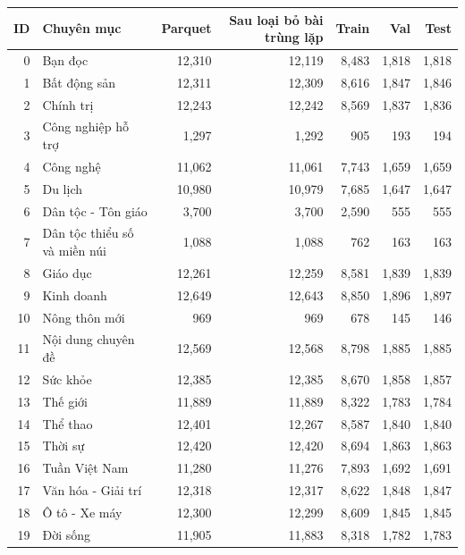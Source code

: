 \begin{tabularx}{\linewidth}{r>{\raggedright\arraybackslash}Xrrrrr}
\toprule
ID & Chuyên mục & Parquet & Sau loại bỏ bài trùng lặp & Train & Val & Test\\\midrule
0 & Bạn đọc & 12,310 & 12,119 & 8,483 & 1,818 & 1,818\\
1 & Bất động sản & 12,311 & 12,309 & 8,616 & 1,847 & 1,846\\
2 & Chính trị & 12,243 & 12,242 & 8,569 & 1,837 & 1,836\\
3 & Công nghiệp hỗ trợ & 1,297 & 1,292 & 905 & 193 & 194\\
4 & Công nghệ & 11,062 & 11,061 & 7,743 & 1,659 & 1,659\\
5 & Du lịch & 10,980 & 10,979 & 7,685 & 1,647 & 1,647\\
6 & Dân tộc - Tôn giáo & 3,700 & 3,700 & 2,590 & 555 & 555\\
7 & Dân tộc thiểu số và miền núi & 1,088 & 1,088 & 762 & 163 & 163\\
8 & Giáo dục & 12,261 & 12,259 & 8,581 & 1,839 & 1,839\\
9 & Kinh doanh & 12,649 & 12,643 & 8,850 & 1,896 & 1,897\\
10 & Nông thôn mới & 969 & 969 & 678 & 145 & 146\\
11 & Nội dung chuyên đề & 12,569 & 12,568 & 8,798 & 1,885 & 1,885\\
12 & Sức khỏe & 12,385 & 12,385 & 8,670 & 1,858 & 1,857\\
13 & Thế giới & 11,889 & 11,889 & 8,322 & 1,783 & 1,784\\
14 & Thể thao & 12,401 & 12,267 & 8,587 & 1,840 & 1,840\\
15 & Thời sự & 12,420 & 12,420 & 8,694 & 1,863 & 1,863\\
16 & Tuần Việt Nam & 11,280 & 11,276 & 7,893 & 1,692 & 1,691\\
17 & Văn hóa - Giải trí & 12,318 & 12,317 & 8,622 & 1,848 & 1,847\\
18 & Ô tô - Xe máy & 12,300 & 12,299 & 8,609 & 1,845 & 1,845\\
19 & Đời sống & 11,905 & 11,883 & 8,318 & 1,782 & 1,783\\
\bottomrule\end{tabularx}
